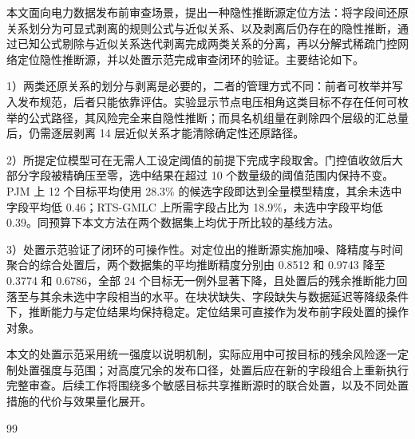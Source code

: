 \documentclass[UTF8,zihao=5,twoside]{ctexart}
\begin{document}
本文面向电力数据发布前审查场景，提出一种隐性推断源定位方法：将字段间还原关系划分为可显式剥离的规则公式与近似关系、以及剥离后仍存在的隐性推断，通过已知公式剔除与近似关系迭代剥离完成两类关系的分离，再以分解式稀疏门控网络定位隐性推断源，并以处置示范完成审查闭环的验证。主要结论如下。

1）两类还原关系的划分与剥离是必要的，二者的管理方式不同：前者可枚举并写入发布规范，后者只能依靠评估。实验显示节点电压相角这类目标不存在任何可枚举的公式路径，其风险完全来自隐性推断；而具名机组量在剥除四个层级的汇总量后，仍需逐层剥离 14 层近似关系才能清除确定性还原路径。

2）所提定位模型可在无需人工设定阈值的前提下完成字段取舍。门控值收敛后大部分字段被精确压至零，选中结果在超过 10 个数量级的阈值范围内保持不变。PJM 上 12 个目标平均使用 28.3\% 的候选字段即达到全量模型精度，其余未选中字段平均低 0.46；RTS-GMLC 上所需字段占比为 18.9\%，未选中字段平均低 0.39。同预算下本文方法在两个数据集上均优于所比较的基线方法。

3）处置示范验证了闭环的可操作性。对定位出的推断源实施加噪、降精度与时间聚合的综合处置后，两个数据集的平均推断精度分别由 0.8512 和 0.9743 降至 0.3774 和 0.6786，全部 24 个目标无一例外显著下降，且处置后的残余推断能力回落至与其余未选中字段相当的水平。在块状缺失、字段缺失与数据延迟等降级条件下，推断能力与定位结果均保持稳定。定位结果可直接作为发布前字段处置的操作对象。

本文的处置示范采用统一强度以说明机制，实际应用中可按目标的残余风险逐一定制处置强度与范围；对高度冗余的发布口径，处置后应在新的字段组合上重新执行完整审查。后续工作将围绕多个敏感目标共享推断源时的联合处置，以及不同处置措施的代价与效果量化展开。

\begin{thebibliography}{99}

\end{thebibliography}

\vspace{0.6em}
\end{document}
